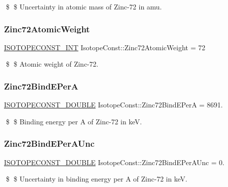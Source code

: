 \$ \$ Uncertainty in atomic mass of Zinc-\/72 in amu. \mbox{\label{group___isotope_const-_zinc-_zn72_ga6530fb89a78151fb94d7c5ca8c442607}} 
\subsubsection{\texorpdfstring{Zinc72\+Atomic\+Weight}{Zinc72AtomicWeight}}
{\footnotesize\ttfamily \mbox{\hyperlink{group___isotope_const-_macros_ga5f18360b3e99483a35c32d789e62621c}{I\+S\+O\+T\+O\+P\+E\+C\+O\+N\+S\+T\+\_\+\+I\+NT}} Isotope\+Const\+::\+Zinc72\+Atomic\+Weight = 72}

\$ \$ Atomic weight of Zinc-\/72. \mbox{\label{group___isotope_const-_zinc-_zn72_ga42a9ac6ba24f1cd98019ab984450b476}} 
\subsubsection{\texorpdfstring{Zinc72\+Bind\+E\+PerA}{Zinc72BindEPerA}}
{\footnotesize\ttfamily \mbox{\hyperlink{group___isotope_const-_macros_ga8f45a7272ce02c0b4c65c44636ed719a}{I\+S\+O\+T\+O\+P\+E\+C\+O\+N\+S\+T\+\_\+\+D\+O\+U\+B\+LE}} Isotope\+Const\+::\+Zinc72\+Bind\+E\+PerA = 8691.}

\$ \$ Binding energy per A of Zinc-\/72 in keV. \mbox{\label{group___isotope_const-_zinc-_zn72_ga1d13a3fd1c350fa60fad4761050b39a5}} 
\subsubsection{\texorpdfstring{Zinc72\+Bind\+E\+Per\+A\+Unc}{Zinc72BindEPerAUnc}}
{\footnotesize\ttfamily \mbox{\hyperlink{group___isotope_const-_macros_ga8f45a7272ce02c0b4c65c44636ed719a}{I\+S\+O\+T\+O\+P\+E\+C\+O\+N\+S\+T\+\_\+\+D\+O\+U\+B\+LE}} Isotope\+Const\+::\+Zinc72\+Bind\+E\+Per\+A\+Unc = 0.}

\$ \$ Uncertainty in binding energy per A of Zinc-\/72 in keV. \mbox{\label{group___isotope_const-_zinc-_zn72_ga53e65e231ed454e484b6646b8bdcef73}} 
